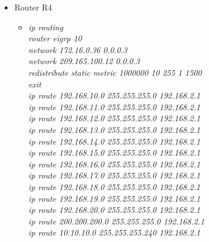 \documentclass[a4paper, 12pt]{article}
\begin{document}
\begin{itemize}
\begin{itemize}
\begin{itemize}
          \end{itemize}
             \item Router R4
        \begin{itemize}
         \item \textit{ip routing\\
            router eigrp 10\\
            network 172.16.0.36 0.0.0.3\\
            network 209.165.100.12 0.0.0.3\\
            redistribute static metric 1000000 10 255 1 1500\\
            exit\\
            ip route 192.168.10.0 255.255.255.0 192.168.2.1\\
            ip route 192.168.11.0 255.255.255.0 192.168.2.1\\
            ip route 192.168.12.0 255.255.255.0 192.168.2.1\\
            ip route 192.168.13.0 255.255.255.0 192.168.2.1\\
            ip route 192.168.14.0 255.255.255.0 192.168.2.1\\
            ip route 192.168.15.0 255.255.255.0 192.168.2.1\\
            ip route 192.168.16.0 255.255.255.0 192.168.2.1\\
            ip route 192.168.17.0 255.255.255.0 192.168.2.1\\
            ip route 192.168.18.0 255.255.255.0 192.168.2.1\\
            ip route 192.168.19.0 255.255.255.0 192.168.2.1\\
            ip route 192.168.20.0 255.255.255.0 192.168.2.1\\
            ip route 200.200.200.0 255.255.255.0 192.168.2.1\\
            ip route 10.10.10.0 255.255.255.240 192.168.2.1\\}
         

\end{itemize}
\end{itemize}
\end{itemize}
\end{document}
